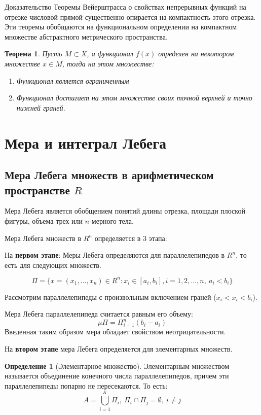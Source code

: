 \documentclass[14pt,a4paper]{extarticle}
\newtheorem{theorem}{Теорема}[section]
\theoremstyle{definition}
\newtheorem{definition}{Определение}[section]
\theoremstyle{remark}
\renewcommand{\[}{\begin{dmath*}[compact]}
\renewcommand{\]}{\end{dmath*}}
\newcommand{\be}{\begin{enumerate}}
\newcommand{\ee}{\end{enumerate}}
\newcommand{\sep}{ , \ \allowbreak }
\begin{document}
Доказательство Теоремы Вейерштрасса о свойствах непрерывных функций
на отрезке числовой прямой существенно опирается на компактность этого отрезка.
Эти теоремы обобщаются на функциональном определении на компактном
множестве абстрактного метрического пространства.

\begin{theorem}
  Пусть $M\subset X$, а функционал $f(x)$ определен на некотором множестве
  $x \in M$, тогда на этом множестве:
  \be
    \item Функционал является ограниченным
    \item Функционал достигает на этом множестве своих
    точной верхней и точно нижней граней.
  \ee
\end{theorem}

\section{Мера и интеграл Лебега}

\subsection{Мера Лебега множеств в арифметическом пространстве
\texorpdfstring{$R$}{Lg}}

Мера Лебега является обобщением понятий длины отрезка, площади плоской фигуры,
объема трех или $n$-мерного тела.

Мера Лебега множеств в $R^n$ определяется в 3 этапа:

На \textbf{первом этапе}: Меры Лебега определяются для параллелепипедов в $R^n$,
то есть для следующих множеств.

\[\Pi = \{x=(x_1,\dots,x_n)\in R^n: x_i\in [a_i,b_i], i=1,2,\dots,n\sep
a_i<b_i\}\]

Рассмотрим параллелепипеды с произвольным включением граней ($x_i<x_i<b_i$).

Мера Лебега параллелепипеда считается равным его объему:
\[\mu\Pi = \Pi_{i=1}^n(b_i-a_i)\]
Введенная таким образом мера обладает свойством неотрицательности.

На \textbf{втором этапе} мера Лебега определяется для элементарных множеств.

\begin{definition}[Элементарное множество]
  Элементарным множеством называется объединение конечного
  числа параллелепипедов, причем эти параллелепипеды попарно не пересекаются.
  То есть:
  \[A=\bigcup _{i=1}^K \Pi_i\sep\Pi_i \cap \Pi_j = \emptyset \sep i\neq j\]
\end{definition}
\end{document}
